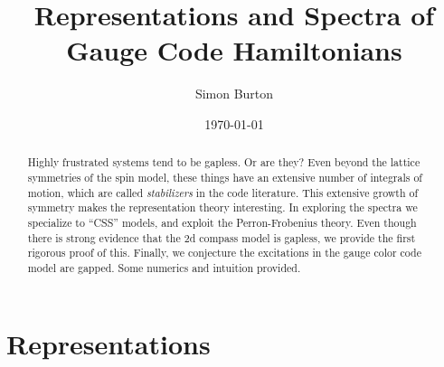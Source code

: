 \documentclass[12pt]{article}
\begin{document}
\title{Representations and Spectra of Gauge Code Hamiltonians}

\author{Simon Burton}

\date{\today}


\maketitle

\begin{abstract}
Highly frustrated systems tend to be gapless. Or are they?
Even beyond the lattice symmetries of the spin model,
these things have an extensive number of integrals of motion, 
which are called \emph{stabilizers} in the code literature.
This extensive growth of symmetry
makes the representation theory interesting.
In exploring the spectra we specialize to ``CSS'' models,
and exploit the Perron-Frobenius theory.
Even though there is strong evidence that the 2d
compass model is gapless, 
we provide the first rigorous proof of this.
Finally, we conjecture the excitations in
the gauge color code model are gapped.
Some numerics and intuition provided.
\end{abstract}

\newpage
\tableofcontents
\newpage


\def\Complex{\mathbb{C}}
\def\C{\mathbb{C}}
\def\R{\mathbb{R}}
\def\Z{\mathbb{Z}}
\def\Ham{H} 
\def\Pauli{\mathcal{P}}
\def\Spec{\mbox{Spec}}
\def\Proveit{{\it (Proof??)}}
\def\GL{\mathrm{GL}}
\def\half{\frac{1}{2}}
\def\Stab{S}

\newcommand{\ket}[1]{|{#1}\rangle}
\newcommand{\expect}[1]{\langle{#1}\rangle}
\newcommand{\bra}[1]{\langle{#1}|}
\newcommand{\ketbra}[2]{\ket{#1}\!\bra{#2}}
\newcommand{\braket}[2]{\langle{#1}|{#2}\rangle}


%
%

\section{Representations}
\end{document}
